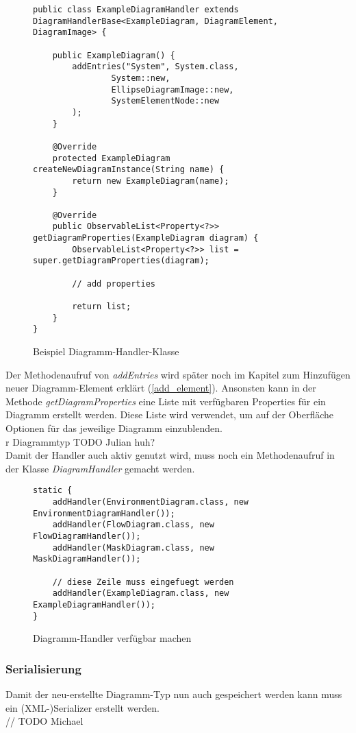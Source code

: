 \begin{figure}[h!]
	\centering
	\begin{lstlisting}
public class ExampleDiagramHandler extends DiagramHandlerBase<ExampleDiagram, DiagramElement, DiagramImage> {

    public ExampleDiagram() {
        addEntries("System", System.class,
                System::new,
                EllipseDiagramImage::new,
                SystemElementNode::new
        );
    }

    @Override
    protected ExampleDiagram createNewDiagramInstance(String name) {
        return new ExampleDiagram(name);
    }
    
    @Override
    public ObservableList<Property<?>> getDiagramProperties(ExampleDiagram diagram) {
        ObservableList<Property<?>> list = super.getDiagramProperties(diagram);

		// add properties

        return list;
    }
}
	\end{lstlisting}
	\label{diagram_handler}
	\caption{Beispiel Diagramm-Handler-Klasse}
\end{figure}
Der Methodenaufruf von \textit{addEntries} wird später noch im Kapitel zum Hinzufügen neuer Diagramm-Element
erklärt (\ref{add_element}). Ansonsten kann in der Methode \textit{getDiagramProperties} eine Liste mit verfügbaren
Properties für ein Diagramm erstellt werden. Diese Liste wird verwendet, um auf der Oberfläche Optionen für das
jeweilige Diagramm einzublenden.
\\r Diagrammtyp TODO Julian huh?
\\
Damit der Handler auch aktiv genutzt wird, muss noch ein Methodenaufruf in der Klasse \textit{DiagramHandler} gemacht
werden.

\begin{figure}[h!]
	\centering
	\begin{lstlisting}
static {
    addHandler(EnvironmentDiagram.class, new EnvironmentDiagramHandler());
    addHandler(FlowDiagram.class, new FlowDiagramHandler());
    addHandler(MaskDiagram.class, new MaskDiagramHandler());
        
    // diese Zeile muss eingefuegt werden
    addHandler(ExampleDiagram.class, new ExampleDiagramHandler());
}
	\end{lstlisting}
	\label{diagram_handler}
	\caption{Diagramm-Handler verfügbar machen}
\end{figure}
\subsubsection{Serialisierung}
Damit der neu-erstellte Diagramm-Typ nun auch gespeichert werden kann muss ein (XML-)Serializer erstellt werden.
\\
// TODO Michael

